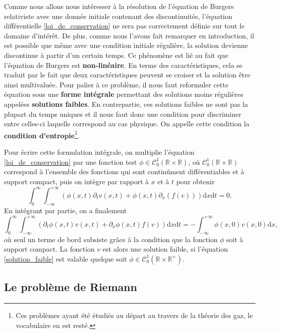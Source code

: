 \documentclass[11pt,a4paper]{article}
\begin{document}
Comme nous allons nous intéresser à la résolution de l'équation de Burgers relativiste avec une donnée initiale contenant des discontinuités, l'équation différentielle \eqref{loi_de_conservation} ne sera pas correctement définie sur tout le domaine d'intérêt. De plus, comme nous l'avons fait remarquer en introduction, il est possible que même avec une condition initiale régulière, la solution devienne discontinue à partir d'un certain temps. Ce phénomène est lié au fait que l'équation de Burgers est \textbf{non-linéaire}. En terme des caractéristiques, cela se traduit par le fait que deux caractéristiques peuvent se croiser et la solution être ainsi multivaluée.
Pour palier à ce problème, il nous faut reformuler cette équation sous une \textbf{forme intégrale} permettant des solutions moins régulières appelées \textbf{solutions faibles}. En contrepartie, ces solutions faibles ne sont pas la plupart du temps uniques et il nous faut donc une condition pour discriminer entre celles-ci laquelle correspond au cas physique. On appelle cette condition la \textbf{condition d'entropie}\footnote{Ces problèmes ayant été étudiés au départ au travers de la théorie des gaz, le vocabulaire en est resté.}.

Pour écrire cette formulation intégrale, on multiplie l'équation \eqref{loi_de_conservation} par une fonction test $\phi\in\mathcal{C}_0^1\left(\mathbb{R}\times\mathbb{R}\right)$, où $\mathcal{C}_0^1\left(\mathbb{R}\times\mathbb{R}\right)$ correspond à l'ensemble des fonctions qui sont continûment différentiables et à support compact, puis on intègre par rapport à $x$ et à $t$ pour obtenir
\begin{equation}
	\int_0^\infty \int_{-\infty}^{+\infty} \left(\phi(x,t)\partial_t v(x,t) + \phi(x,t)\partial_x\left(f(v)\right)\right)\mathrm{d}x\mathrm{d}t = 0.
\end{equation}
En intégrant par partie, on a finalement
\begin{equation}\label{solution_faible}
	\int_0^\infty \int_{-\infty}^{+\infty} \left(\partial_t \phi(x,t) v(x,t) + \partial_x \phi(x,t) f(v)\right)\mathrm{d}x\mathrm{d}t = -\int_{-\infty}^{+\infty}\phi(x,0)v(x,0)\mathrm{d}x,
\end{equation}
où seul un terme de bord subsiste grâce à la condition que la fonction $\phi$ soit à support compact.
La fonction $v$ est alors une solution faible, si l'équation \eqref{solution_faible} est valable quelque soit $\phi\in\mathcal{C}_0^1\left(\mathbb{R}\times\mathbb{R^+}\right)$.

\subsection{Le problème de Riemann}\label{probleme_riemann_standard}
\end{document}
